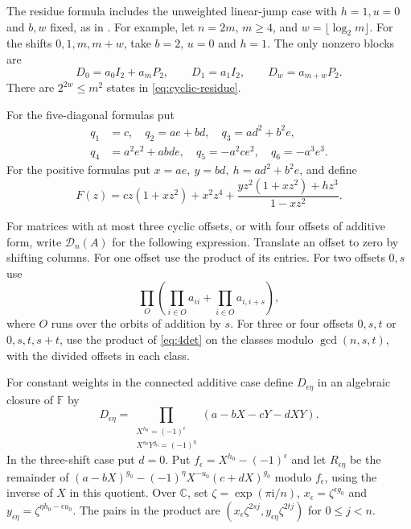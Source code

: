 \documentclass[11pt,reqno]{amsart}
\theoremstyle{remark}
\numberwithin{equation}{section}
\newcommand{\F}{\mathbb F}
\begin{document}
The residue formula includes the unweighted linear-jump case
with \(h=1,u=0\) and \(b,w\) fixed, as in \cite{GolinLeungWang}.
For example, let \(n=2m\), \(m\ge4\), and \(w=\lfloor\log_2 m\rfloor\).
For the shifts \(0,1,m,m+w\), take \(b=2\), \(u=0\) and \(h=1\).
The only nonzero blocks are
\[
 D_0=a_0I_2+a_mP_2,\qquad D_1=a_1I_2,\qquad D_w=a_{m+w}P_2.
\]
There are \(2^{2w}\le m^2\) states in \eqref{eq:cyclic-residue}.

For the five-diagonal formulas put
\begin{equation}\label{eq:penta-par}
 \begin{split}
 q_1&=c,\quad q_2=ae+bd,\quad q_3=ad^2+b^2e,\\
 q_4&=a^2e^2+abde,\quad q_5=-a^2ce^2,\quad q_6=-a^3e^3 .
 \end{split}
\end{equation}
For the positive formulas put \(x=ae,\ y=bd,\ h=ad^2+b^2e\), and define
\begin{equation}\label{eq:firstreturn}
 F(z)=cz(1+xz^2)+x^2z^4+
         \frac{yz^2(1+xz^2)+hz^3}{1-xz^2}.
\end{equation}

For matrices with at most three cyclic offsets, or with four
offsets of additive form, write \(\mathcal D_n(A)\) for the
following expression. Translate an offset to zero by shifting
columns. For one offset use the product of its entries. For
two offsets \(0,s\) use
\begin{equation}\label{eq:two-shift}
 \prod_O\left(\prod_{i\in O}a_{ii}+\prod_{i\in O}a_{i,i+s}\right),
\end{equation}
where \(O\) runs over the orbits of addition by \(s\). For
three or four offsets \(0,s,t\) or \(0,s,t,s+t\), use the
product of \eqref{eq:4det} on the classes modulo
\(\gcd(n,s,t)\), with the divided offsets in each class.

For constant weights in the connected additive case define
\(D_{\epsilon\eta}\) in an algebraic closure of \(\F\) by
\begin{equation}\label{eq:products}
 D_{\epsilon\eta}=
 \prod_{\substack{X^{h_0}=(-1)^\epsilon\\
                  X^{u_0}Y^{g_0}=(-1)^\eta}}
                 (a-bX-cY-dXY).
\end{equation}
In the three-shift case put \(d=0\). Put
\(f_\epsilon=X^{h_0}-(-1)^\epsilon\) and let \(R_{\epsilon\eta}\)
be the remainder of \((a-bX)^{g_0}-(-1)^\eta X^{-u_0}(c+dX)^{g_0}\)
modulo \(f_\epsilon\), using the inverse of \(X\) in this quotient.
Over \(\mathbb C\), set \(\zeta=\exp(\pi\mathrm i/n)\),
\(x_\epsilon=\zeta^{\epsilon g_0}\) and
\(y_{\epsilon\eta}=\zeta^{\eta h_0-\epsilon u_0}\).
The pairs in the product are
\((x_\epsilon\zeta^{2sj},y_{\epsilon\eta}\zeta^{2tj})\)
for \(0\le j<n\).
\end{document}
